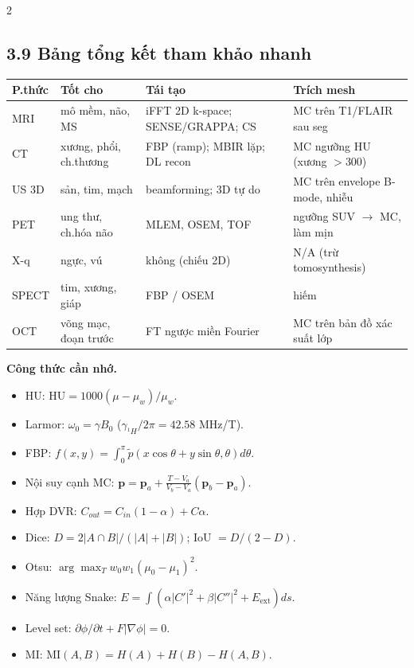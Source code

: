 \begin{paracol}{2}
\switchcolumn

\subsection*{3.9 Bảng tổng kết tham khảo nhanh}
\scriptsize
\begin{tabular}{@{}llll@{}}
\toprule
P.thức & Tốt cho & Tái tạo & Trích mesh \\
\midrule
MRI & mô mềm, não, MS & iFFT 2D k-space; SENSE/GRAPPA; CS & MC trên T1/FLAIR sau seg \\
CT & xương, phổi, ch.thương & FBP (ramp); MBIR lặp; DL recon & MC ngưỡng HU (xương $>$300) \\
US 3D & sản, tim, mạch & beamforming; 3D tự do & MC trên envelope B-mode, nhiễu \\
PET & ung thư, ch.hóa não & MLEM, OSEM, TOF & ngưỡng SUV $\to$ MC, làm mịn \\
X-q & ngực, vú & không (chiếu 2D) & N/A (trừ tomosynthesis) \\
SPECT & tim, xương, giáp & FBP / OSEM & hiếm \\
OCT & võng mạc, đoạn trước & FT ngược miền Fourier & MC trên bản đồ xác suất lớp \\
\bottomrule
\end{tabular}
\normalsize

\medskip
\textbf{Công thức cần nhớ.}
\begin{itemize}[leftmargin=*,nosep]
  \item HU: $\mathrm{HU}=1000(\mu-\mu_w)/\mu_w$.
  \item Larmor: $\omega_0=\gamma B_0$ ($\gamma_{^1\!H}/2\pi=42.58$ MHz/T).
  \item FBP: $f(x,y)=\!\int_0^\pi\!\tilde p(x\cos\theta+y\sin\theta,\theta)d\theta$.
  \item Nội suy cạnh MC: $\mathbf p=\mathbf p_a+\frac{T-V_a}{V_b-V_a}(\mathbf p_b-\mathbf p_a)$.
  \item Hợp DVR: $C_{out}=C_{in}(1-\alpha)+C\alpha$.
  \item Dice: $D=2|A\cap B|/(|A|+|B|)$; IoU $=D/(2-D)$.
  \item Otsu: $\arg\max_T w_0w_1(\mu_0-\mu_1)^2$.
  \item Năng lượng Snake: $E=\!\int(\alpha|C'|^2+\beta|C''|^2+E_{\text{ext}})ds$.
  \item Level set: $\partial\phi/\partial t+F|\nabla\phi|=0$.
  \item MI: $\mathrm{MI}(A,B)=H(A)+H(B)-H(A,B)$.
\end{itemize}

\end{paracol}
